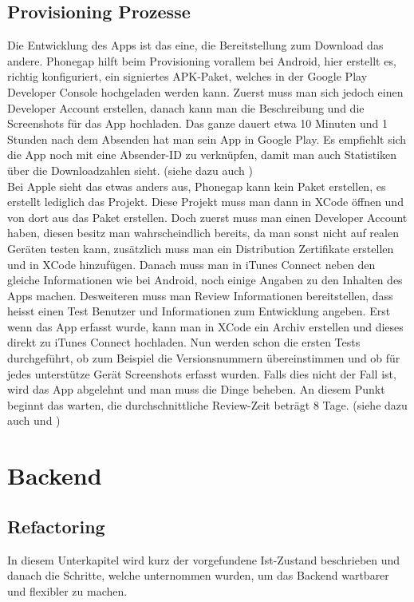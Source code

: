 \subsection{Provisioning Prozesse}
Die Entwicklung des Apps ist das eine, die Bereitstellung zum Download das andere. Phonegap hilft beim Provisioning vorallem bei Android, hier erstellt es, richtig konfiguriert, ein signiertes APK-Paket, welches in der Google Play Developer Console hochgeladen werden kann. Zuerst muss man sich jedoch einen Developer Account erstellen, danach kann man die Beschreibung und die Screenshots für das App hochladen. Das ganze dauert etwa 10 Minuten und 1 Stunden nach dem Absenden hat man sein App in Google Play. Es empfiehlt sich die App noch mit eine Absender-ID zu verknüpfen, damit man auch Statistiken über die Downloadzahlen sieht. (siehe dazu auch \cite{android_prov})\\
Bei Apple sieht das etwas anders aus, Phonegap kann kein Paket erstellen, es erstellt lediglich das Projekt. Diese Projekt muss man dann in XCode öffnen und von dort aus das Paket erstellen. Doch zuerst muss man einen Developer Account haben, diesen besitz man wahrscheindlich bereits, da man sonst nicht auf realen Geräten testen kann, zusätzlich muss man ein Distribution Zertifikate erstellen und in XCode hinzufügen. Danach muss man in iTunes Connect neben den gleiche Informationen wie bei Android, noch einige Angaben zu den Inhalten des Apps machen. Desweiteren muss man Review Informationen bereitstellen, dass heisst einen Test Benutzer und Informationen zum Entwicklung angeben. Erst wenn das App erfasst wurde, kann man in XCode ein Archiv erstellen und dieses direkt zu iTunes Connect hochladen. Nun werden schon die ersten Tests durchgeführt, ob zum Beispiel die Versionsnummern übereinstimmen und ob für jedes unterstütze Gerät Screenshots erfasst wurden. Falls dies nicht der Fall ist, wird das App abgelehnt und man muss die Dinge beheben. An diesem Punkt beginnt das warten, die durchschnittliche Review-Zeit beträgt 8 Tage. (siehe dazu auch \cite{apple_prov_apple} und \cite{apple_prov_ralf})

\FloatBarrier
\section{Backend}\label{impl_backend}

\subsection{Refactoring}
In diesem Unterkapitel wird kurz der vorgefundene Ist-Zustand beschrieben und danach die Schritte, welche unternommen wurden, um das Backend wartbarer und flexibler zu machen.

